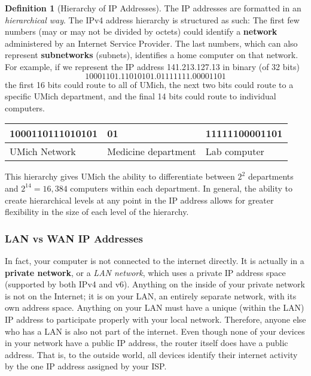 \documentclass[a4paper, 12pt]{report}
\theoremstyle{remark}
\theoremstyle{definition}
\newtheorem{definition}{Definition}[section]
\begin{document}
\begin{definition}[Hierarchy of IP Addresses]
The IP addresses are formatted in an \textit{hierarchical way}. The IPv4 address hierarchy is structured as such: The first few numbers (may or may not be divided by octets) could identify a \textbf{network} administered by an Internet Service Provider. The last numbers, which can also represent \textbf{subnetworks} (subnets), identifies a home computer on that network. For example, if we represent the IP address 141.213.127.13 in binary (of 32 bits)
\[10001101.11010101.01111111.00001101\]
the first 16 bits could route to all of UMich, the next two bits could route to a specific UMich department, and the final 14 bits could route to individual computers. 
\begin{center}
\begin{tabular}{l|l|l}
    1000110111010101 & 01 & 11111100001101  \\
    \hline
    UMich Network & Medicine department & Lab computer 
\end{tabular}
\end{center}
This hierarchy gives UMich the ability to differentiate between $2^2$ departments and $2^{14} = 16,384$ computers within each department. In general, the ability to create hierarchical levels at any point in the IP address allows for greater flexibility in the size of each level of the hierarchy. 
\end{definition}

\subsubsection{LAN vs WAN IP Addresses}
In fact, your computer is not connected to the internet directly. It is actually in a \textbf{private network}, or a \textit{LAN network}, which uses a private IP address space (supported by both IPv4 and v6). Anything on the inside of your private network is not on the Internet; it is on your LAN, an entirely separate network, with its own address space. Anything on your LAN must have a unique (within the LAN) IP address to participate properly with your local network. Therefore, anyone else who has a LAN is also not part of the internet. Even though none of your devices in your network have a public IP address, the router itself does have a public address. That is, to the outside world, all devices identify their internet activity by the one IP address assigned by your ISP.  
\end{document}
